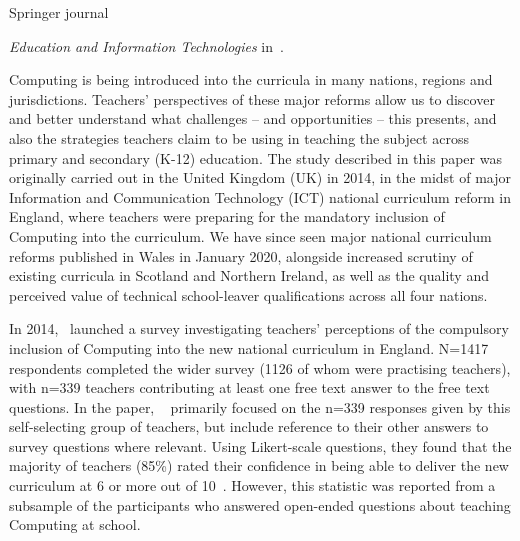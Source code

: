 \documentclass[]{interact}
\theoremstyle{plain}%
\theoremstyle{definition}
\theoremstyle{remark}
\begin{document}
Springer journal {\emph{Education and Information Technologies}
in~\citeyear{sentance+csizmadia:2017}.

Computing is being introduced into the curricula in many nations,
regions and jurisdictions. Teachers’ perspectives of these major
reforms allow us to discover and better understand what challenges --
and opportunities -- this presents, and also the strategies teachers
claim to be using in teaching the subject across primary
and secondary (K-12) education. The study described in this paper was
originally carried out in the United Kingdom (UK) in 2014, in the
midst of major Information and Communication Technology (ICT) national
curriculum reform in England, where teachers were preparing for the
mandatory inclusion of Computing into the curriculum. We have since
seen major national curriculum reforms published in Wales in January
2020, alongside increased scrutiny of existing curricula in Scotland
and Northern Ireland, as well as the quality and perceived value of
technical school-leaver qualifications across all four nations.

In 2014,~\citeauthor*{sentance+csizmadia:2017} launched a survey
investigating teachers’ perceptions of the compulsory inclusion of
Computing into the new national curriculum in England. N=1417
respondents completed the wider survey (1126 of whom were practising
teachers), with n=339 teachers contributing at least one free text
answer to the free text questions. In the paper,
~\citeauthor*{sentance+csizmadia:2017} primarily focused on the n=339
responses given by this self-selecting group of teachers, but include
reference to their other answers to survey questions where
relevant. Using Likert-scale questions, they found that the majority
of teachers (85\%) rated their confidence in being able to deliver the
new curriculum at 6 or more out of 10~\citep{sentance+csizmadia:2017}.
However, this statistic was reported from a subsample of the
participants who answered open-ended questions about teaching
Computing at school.

}
\end{document}
